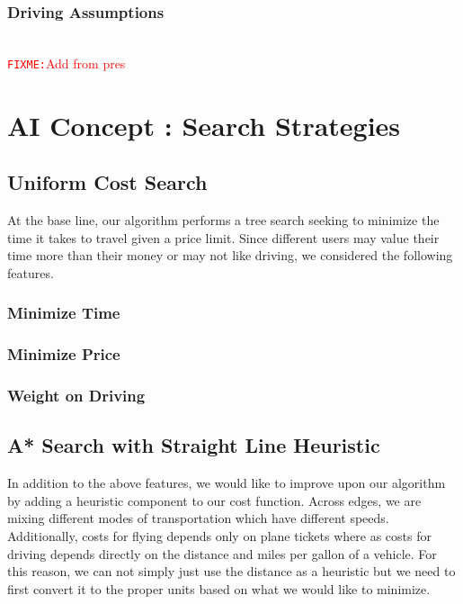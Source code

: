 \documentclass[11pt]{article}
\newcommand{\FIXME}[1]{ \ \\ \hspace* {-1.5 cm}
  \textcolor{red}{\texttt{FIXME:}#1} \medskip\par}
\begin{document}
\subsubsection{Driving Assumptions}

\FIXME{Add from pres}


\section{AI Concept : Search Strategies}

\subsection{Uniform Cost Search}

At the base line, our algorithm performs a tree search seeking to minimize the time it takes to travel given a price limit. 
Since different users may value their time more than their money or may not like driving, we considered the following features.

\subsubsection{Minimize Time}

\subsubsection{Minimize Price}

\subsubsection{Weight on Driving}

\subsection{A* Search with Straight Line Heuristic}

In addition to the above features, we would like to improve upon our algorithm by adding a heuristic component to our cost function. 
Across edges, we are mixing different modes of transportation which have different speeds. Additionally, costs for flying depends only on plane tickets where as costs for driving depends directly on the distance and miles per gallon of a vehicle. 
For this reason, we can not simply just use the distance as a heuristic but we need to first convert it to the proper units based on what we would like to minimize.
\end{document}
